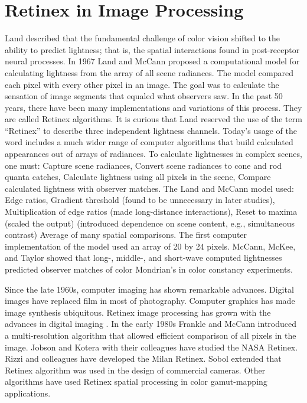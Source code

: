 \section{Retinex in Image Processing}
Land described that the fundamental challenge of color vision shifted to the ability to predict lightness; that is, the spatial interactions found in post-receptor neural processes. In 1967 Land and McCann proposed a computational model for calculating lightness from the array of all scene radiances. The model compared each pixel with every other pixel in an image. The goal was to calculate the sensation of image segments that equaled what observers saw. In the past 50 years, there have been many implementations and variations of this process. They are called Retinex algorithms. It is curious that Land reserved the use of the term “Retinex” to describe three independent lightness channels\cite{ssr}. Today’s usage of the word includes a much wider range of computer algorithms that build calculated appearances out of arrays of radiances. To calculate lightnesses in complex scenes, one must: Capture scene radiances, Convert scene radiances to cone and rod quanta catches, Calculate lightness using all pixels in the scene, Compare calculated lightness with observer matches. The Land and McCann model used: Edge ratios, Gradient threshold (found to be unnecessary in later studies), Multiplication of edge ratios (made long-distance interactions), Reset to maxima (scaled the output) (introduced dependence on scene content, e.g., simultaneous contrast) Average of many spatial comparisons. The first computer implementation of the model used an array of 20 by 24 pixels. McCann, McKee, and Taylor showed that long-, middle-, and short-wave computed lightnesses predicted observer matches of color Mondrian’s in color constancy experiments\cite{retinex}.

Since the late 1960s, computer imaging has shown remarkable advances. Digital images have replaced film in most of photography. Computer graphics has made image synthesis ubiquitous. Retinex image processing has grown with the advances in digital imaging . In the early 1980s Frankle and McCann introduced a multi-resolution algorithm that allowed efficient comparison of all pixels in the image. Jobson and Kotera with their colleagues have studied the NASA Retinex. Rizzi and colleagues have developed the Milan Retinex. Sobol extended that Retinex algorithm was used in the design of commercial cameras. Other algorithms have used Retinex spatial processing in color gamut-mapping applications\cite{dip2}.


